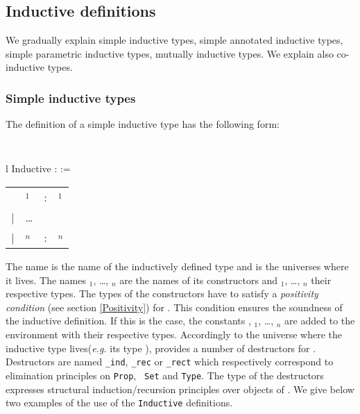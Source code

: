 
\subsection{Inductive definitions}
 \label{gal_Inductive_Definitions}
\label{Inductive}

We gradually explain simple inductive types, simple
annotated inductive types, simple parametric inductive types, 
mutually inductive types. We explain also co-inductive types.

\subsubsection{Simple inductive types}

The definition of a simple inductive type has the following form:

\medskip
{\tt 
\begin{tabular}{l}
Inductive {\ident} : {\sort} :=  \\
\begin{tabular}{clcl}
   & {\ident$_1$}  &:& {\type$_1$} \\
 | & {\ldots} && \\
 | & {\ident$_n$} &:& {\type$_n$}
\end{tabular}
\end{tabular}
}
\medskip

The name {\ident} is the name of the inductively defined type and
{\sort} is the universes where it lives.
The names {\ident$_1$}, {\ldots}, {\ident$_n$}
are the names of its constructors and {\type$_1$}, {\ldots},
{\type$_n$} their respective types. The types of the constructors have
to satisfy a {\em positivity condition} (see section \ref{Positivity})
for {\ident}.  This condition ensures the soundness of the inductive
definition.  If this is the case, the constants {\ident},
{\ident$_1$}, {\ldots}, {\ident$_n$} are added to the environment with
their respective types.  Accordingly to the universe where
the inductive type lives({\it e.g.} its type {\sort}), {\Coq} provides a
number of destructors for {\ident}.  Destructors are named
{\ident}{\tt\_ind}, {\ident}{\tt \_rec} or {\ident}{\tt \_rect} which
respectively correspond to elimination principles on {\tt Prop}, {\tt
Set} and {\tt Type}.  The type of the destructors expresses structural
induction/recursion principles over objects of {\ident}. We give below
two examples of the use of the {\tt Inductive} definitions.

